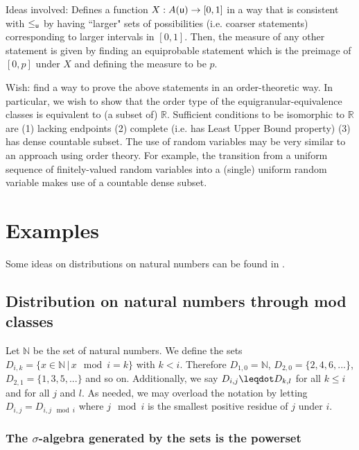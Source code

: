 \documentclass[10pt, onecolumn, longbibliography, nofootinbib]{revtex4-2}
\begin{document}
Ideas involved: Defines a function $X:A(\stmt[u])\to [0,1]$ in a way that is consistent with $\lequ$ by having ``larger" sets of possibilities (i.e. coarser statements) corresponding to larger intervals in $[0,1]$. Then, the measure of any other statement is given by finding an equiprobable statement which is the preimage of $[0,p]$ under $X$ and defining the measure to be $p$.  

Wish: find a way to prove the above statements in an order-theoretic way. In particular, we wish to show that the order type of the equigranular-equivalence classes is equivalent to (a subset of) $\mathbb{R}$. Sufficient conditions to be isomorphic to $\mathbb{R}$ are (1) lacking endpoints (2) complete (i.e. has Least Upper Bound property) (3) has dense countable subset. The use of random variables may be very similar to an approach using order theory. For example, the transition from a uniform sequence of finitely-valued random variables into a (single) uniform random variable makes use of a countable dense subset. 




\section{Examples}

Some ideas on distributions on natural numbers can be found in \cite{Schirokauer2007}.

\subsection{Distribution on natural numbers through mod classes}

Let $\mathbb{N}$ be the set of natural numbers. We define the sets $D_{i,k} = \{ x \in \mathbb{N} \, | \, x \mod i = k \}$ with $k < i$. Therefore $D_{1,0} = \mathbb{N}$, $D_{2,0} = \{ 2, 4, 6, ... \}$, $D_{2,1} = \{ 1, 3, 5, ... \}$ and so on. Additionally, we say $D_{i,j} \finer D_{k,l}$ for all $k \leq i$ and for all $j$ and $l$. As needed, we may overload the notation by letting $D_{i,j} =  D_{i, j \mod i}$ where $j\mod i$ is the smallest positive residue of $j$ under $i$.

\subsubsection{The $\sigma$-algebra generated by the sets is the powerset}
\end{document}
